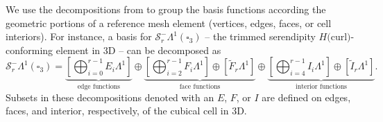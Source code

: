 \documentclass[format=acmsmall,screen,timestamp=false,a4paper]{acmart}
\newcommand{\calS}{\mathcal{S}}
\begin{document}
We use the decompositions from \citet{gillette2019computational} to group the basis functions according the geometric portions of a reference mesh element (vertices, edges, faces, or cell interiors).  For instance, a basis for $\calS^-_r\Lambda^1(\square_3)$ -- the trimmed serendipity $H($curl$)$-conforming element in 3D -- can be decomposed as
   \begin{equation}\label{eq:HCurlTrimmedSerendipityBasis}
   \calS^-_r\Lambda^1(\square_3) =   \underbrace{\left[\bigoplus_{i=0}^{r-1} E_i \Lambda^1\right]}_{\text{edge functions}}\oplus\underbrace{\left[ \bigoplus_{i=2}^{r-1}F_i \Lambda^1\right] \oplus \left[\tilde{F}_r \Lambda^1\right]}_{\text{face functions}}\oplus\underbrace{\left[ \bigoplus_{i=4}^{r-1}I_i \Lambda^1 \right] \oplus \left[\tilde{I}_r \Lambda^1\right]}_{\text{interior functions}}.
   \end{equation}
  Subsets in these decompositions denoted with an $E$, $F$, or $I$ are defined on edges, faces, and interior, respectively, of the cubical cell in 3D.
  
  
\end{document}
